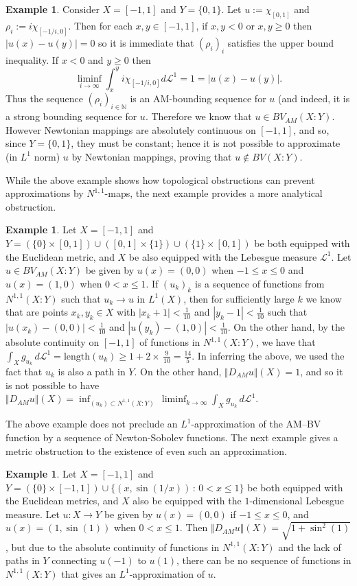 \documentclass[11pt, letterpaper]{amsart} %
\newcommand*{\N}{{\mathbb N}}
\numberwithin{equation}{section}
\theoremstyle{plain}
\theoremstyle{definition}
\newtheorem{example}[equation]{Example}
\begin{document}
{\begin{example}
Consider $X=[-1,1]$ and $Y=\{ 0,1\}$. Let $u:=\chi _{[0,1]}$ and $\rho_i:=i\chi_{[-1/i,0]}$. Then for each $x,y\in [-1,1]$, if 
$x,y<0$ or $x,y\geq 0$ then $|u(x)-u(y)|=0$ so it is immediate that $(\rho_i)_i$ satisfies the upper bound inequality. 
If $x<0$ and $y\ge 0$ then
\[
\liminf_{i\to\infty}\int_x^y i\chi_{[-1/i,0]} d\mathcal{L}^1=
1=|u(x)-u(y)|.
\]
Thus the sequence $(\rho_i)_{i\in\N}$ is an AM-bounding sequence for $u$ (and indeed, it is a strong
bounding sequence for $u$.
Therefore we know that $u\in BV_{AM}(X:Y)$. However Newtonian mappings 
are absolutely continuous on $[-1,1]$, and so, since $Y=\{ 0,1\}$, they must be constant; hence it is not possible 
to approximate (in $L^1$ norm) $u$ by Newtonian mappings, proving that $u\notin BV(X:Y)$.
\end{example}

While the above example shows how topological obstructions can prevent approximations by $N^{1,1}$-maps, the next example
provides a more analytical obstruction.

\begin{example}
Let $X=[-1,1]$ and $Y=(\{0\}\times[0,1])\cup([0,1]\times\{1\})\cup(\{1\}\times[0,1])$ be both equipped with the Euclidean metric,
and $X$ be also equipped with the Lebesgue measure $\mathcal{L}^1$. Let $u\in BV_{AM}(X:Y)$ be given by 
$u(x)=(0,0)$ when $-1\le x\le 0$ and $u(x)=(1,0)$ when $0<x\le 1$. If $(u_k)_k$ is a sequence of functions from
$N^{1,1}(X:Y)$ such that $u_k\to u$ in $L^1(X)$, then for sufficiently large $k$ we know that are points $x_k,y_k\in X$ 
with $|x_k+1|<\tfrac{1}{10}$ and $|y_k-1|<\tfrac{1}{10}$ such that $|u(x_k)-(0,0)|<\tfrac{1}{10}$ and $|u(y_k)-(1,0)|<\tfrac{1}{10}$. 
On the other hand, by the
absolute continuity on $[-1,1]$ of functions in $N^{1,1}(X:Y)$, we have that 
$\int_Xg_{u_k}\, d\mathcal{L}^1=\text{length}(u_k)\ge 1+2\times\, \tfrac{9}{10}=\tfrac{14}{5}$. In inferring the above, we used
the fact that $u_k$ is also a path in $Y$. On the other hand, $\Vert D_{AM}u\Vert(X)=1$, and so it is not possible to
have $\Vert D_{AM}u\Vert(X)=\inf_{(u_k)\subset N^{1,1}(X:Y)}\, \liminf_{k\to\infty}\int_Xg_{u_k}\, d\mathcal{L}^1$.
\end{example}

The above example does not preclude an $L^1$-approximation of the AM--BV function by a sequence of 
Newton-Sobolev functions. The next example gives a metric obstruction to the existence of even such an approximation.

\begin{example}
Let $X=[-1,1]$ and $Y=(\{0\}\times[-1,1])\cup\{(x,\sin(1/x))\, :\, 0<x\le 1\}$ be both equipped with the Euclidean metrics, and
$X$ also be equipped with the $1$-dimensional Lebesgue measure. Let $u:X\to Y$ be given by
$u(x)=(0,0)$ if $-1\le x\le 0$, and $u(x)=(1,\sin(1))$ when $0<x\le 1$. Then 
$\Vert D_{AM}u\Vert(X)=\sqrt{1+\sin^2(1)}$, but due to the absolute continuity of functions in $N^{1,1}(X:Y)$ and the 
lack of paths in $Y$ connecting $u(-1)$ to $u(1)$, there can be no sequence of functions in $N^{1,1}(X:Y)$ that 
gives an $L^1$-approximation of $u$.
\end{example}

}
\end{document}
